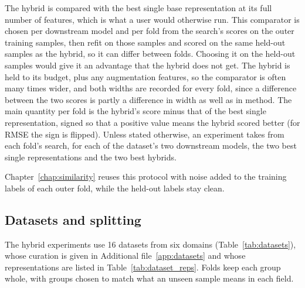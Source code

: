 The hybrid is compared with the best single base representation at its full number of features, which is what a user would otherwise run. This comparator is chosen per downstream model and per fold from the search's scores on the outer training samples, then refit on those samples and scored on the same held-out samples as the hybrid, so it can differ between folds. Choosing it on the held-out samples would give it an advantage that the hybrid does not get. The hybrid is held to its budget, plus any augmentation features, so the comparator is often many times wider, and both widths are recorded for every fold, since a difference between the two scores is partly a difference in width as well as in method. The main quantity per fold is the hybrid's score minus that of the best single representation, signed so that a positive value means the hybrid scored better (for RMSE the sign is flipped). Unless stated otherwise, an experiment takes from each fold's search, for each of the dataset's two downstream models, the two best single representations and the two best hybrids. %

Chapter~\ref{chap:similarity} reuses this protocol with noise added to the training labels of each outer fold, while the held-out labels stay clean.


\subsection{Datasets and splitting}\label{sec:method:datasets}

The hybrid experiments use 16 datasets from six domains (Table~\ref{tab:datasets}), whose curation is given in Additional file~\ref{app:datasets} and whose representations are listed in Table~\ref{tab:dataset_reps}. Folds keep each group whole, with groups chosen to match what an unseen sample means in each field.




